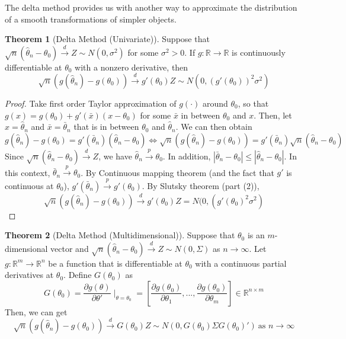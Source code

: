 \documentclass[12pt]{article}
\theoremstyle{definition}
\theoremstyle{property}
\theoremstyle{example}
\newtheorem{theorem}{Theorem}[section]
\begin{document}
 The delta method provides us with another way to approximate the distribution of a smooth transformations of simpler 
objects. 
\begin{mdframed}[backgroundcolor=green!5] 
\begin{theorem}[Delta Method (Univariate)]
Suppose that $\sqrt{n}(\hat{\theta}_n-\theta_0)\xrightarrow{d}Z\sim N(0,\sigma^2)$ for some $\sigma^2>0$. If $g:\mathbb{R}\to\mathbb{R}$ is continuously differentiable at $\theta_0$ with a nonzero derivative, then
\[
\sqrt{n}(g(\hat{\theta}_n)-g(\theta_0))\xrightarrow{d}g'(\theta_0)Z\sim N(0,(g'(\theta_0))^2\sigma^2)
\]
\end{theorem}
\begin{proof}
Take first order Taylor approximation of $g(\cdot)$ around $\theta_0$, so that $g(x)= g(\theta_0)+g'(\bar{x})(x-\theta_0)$ for some $\bar{x}$ in between $\theta_0$ and $x$. Then, let $x=\hat{\theta}_n$ and $\bar{x}=\bar{\theta}_n$ that is in between $\theta_0$ and $\hat{\theta}_n$. We can then obtain
\[
g(\hat{\theta}_n)-g(\theta_0)=g'(\bar{\theta}_n)(\hat{\theta}_n-\theta_0)\iff\sqrt{n}(g(\hat{\theta}_n)-g(\theta_0))=g'(\bar{\theta}_n)\sqrt{n}(\hat{\theta}_n-\theta_0)
\]
Since $\sqrt{n}(\hat{\theta}_n-\theta_0)\xrightarrow{d}Z$, we have $\hat{\theta}_n\xrightarrow{p}\theta_0$. In addition, $|
\bar{\theta}_n-\theta_0|\leq |\hat{\theta}_n-\theta_0|$. In this context, $\bar{\theta}_n\xrightarrow{p}\theta_0$.  By Continuous mapping theorem (and the fact that $g'$ is continuous at $\theta_0$), $g'(\bar{\theta}_n)\xrightarrow{p}g'(\theta_0)$. By Slutsky theorem (part (2)),  
\[
\sqrt{n}(g(\hat{\theta}_n)-g(\theta_0))\xrightarrow{d}g'(\theta_0)Z=N(0,(g'(\theta_0)^2\sigma^2 )
\]
\end{proof}
\begin{theorem}[Delta Method (Multidimensional)]
Suppose that $\theta_0$ is an $m$-dimensional vector and $\sqrt{n}(\hat{\theta}_n-\theta_0)\xrightarrow{d}Z\sim N(0,\Sigma)$ as $n\to\infty$. Let $g:\mathbb{R}^m\to\mathbb{R}^n$ be a function that is differentiable at $\theta_0$ with a continuous partial derivatives at $\theta_0$. Define $G(\theta_0)$ as
\[
G(\theta_0)=\frac{\partial g(\theta)}{\partial\theta'}\mid_{\theta=\theta_0}=\left[\frac{\partial g(\theta_0)}{\partial \theta_1} , ...,\frac{\partial g(\theta_0)}{\partial \theta_m} \right]\in\mathbb{R}^{n\times m}
\]
Then, we can get
\[
\sqrt{n}(g(\hat{\theta}_n)-g(\theta_0))\xrightarrow{d}G(\theta_0)Z\sim N(0, G(\theta_0)\Sigma G(\theta_0)') \ \text{as } n\to\infty
\]
\end{theorem}
\end{mdframed}\par
\end{document}
